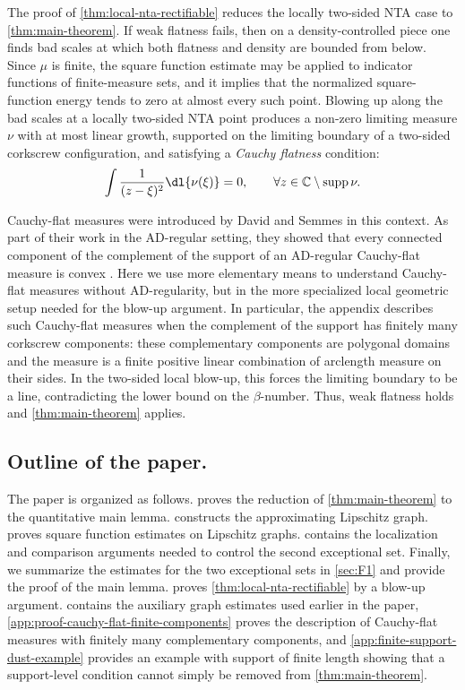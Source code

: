 \documentclass[11pt,a4paper,english,reqno]{amsart}
\numberwithin{equation}{section}
\newcommand{\CC}[0]{\mathbb{C}}
\DeclareMathOperator{\supp}{supp}
\numberwithin{definition}{section}
\begin{document}
The proof of \cref{thm:local-nta-rectifiable} reduces the locally two-sided NTA case to \cref{thm:main-theorem}.  If weak flatness fails, then on a density-controlled piece one finds bad scales at which both flatness and density are bounded from below.  Since $\mu$ is finite, the square function estimate may be applied to indicator functions of finite-measure sets, and it implies that the normalized square-function energy tends to zero at almost every such point.  Blowing up along the bad scales at a locally two-sided NTA point produces a non-zero limiting measure $\nu$ with at most linear growth, supported on the limiting boundary of a two-sided corkscrew configuration, and satisfying a \emph{Cauchy flatness} condition:
\begin{align}
  \int \frac{1}{(z-\xi)^2}\dl{\nu(\xi)}=0,
  \qquad \forall z\in\CC\setminus\supp\nu.
\end{align}

Cauchy-flat measures were introduced by David and Semmes in this context.
As part of their work in the AD-regular setting, they showed that every connected component of the complement of the support of an AD-regular Cauchy-flat measure is convex \cite[Proposition III.2.38]{davidAnalysisUniformlyRectifiable1993}.
Here we use more elementary means to understand Cauchy-flat measures without AD-regularity, but in the more specialized local geometric setup needed for the blow-up argument.
In particular, the appendix describes such Cauchy-flat measures when the complement of the support has finitely many corkscrew components: these complementary components are polygonal domains and the measure is a finite positive linear combination of arclength measure on their sides.
In the two-sided local blow-up, this forces the limiting boundary to be a line, contradicting the lower bound on the $\beta$-number.
Thus, weak flatness holds and \cref{thm:main-theorem} applies.

\subsection*{Outline of the paper.}
The paper is organized as follows.
 proves the reduction of \cref{thm:main-theorem} to the quantitative main lemma.
 constructs the approximating Lipschitz graph.
 proves square function estimates on Lipschitz graphs.
 contains the localization and comparison arguments needed to control the second exceptional set.
Finally, we summarize the estimates for the two exceptional sets in \cref{sec:F1} and provide the proof of the main lemma.
 proves \cref{thm:local-nta-rectifiable} by a blow-up argument.
 contains the auxiliary graph estimates used earlier in the paper,
\cref{app:proof-cauchy-flat-finite-components} proves the description of Cauchy-flat measures with finitely many complementary components,
and \cref{app:finite-support-dust-example} provides an example with support of finite length showing that a support-level condition cannot simply be removed from \cref{thm:main-theorem}.
\end{document}
